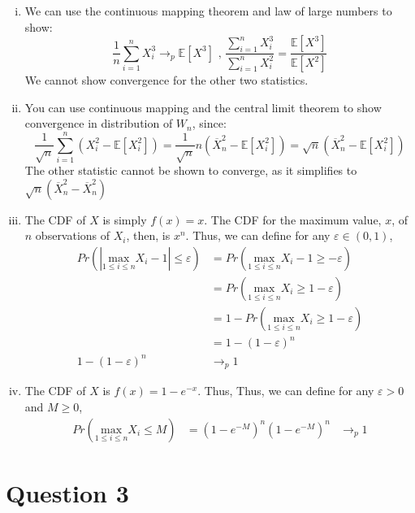 \documentclass{article}
\newcommand{\olx}[1]{\overline{X}_{#1}}
\newcommand{\est}[1]{\frac{1}{#1}\sum_{i=1}^{#1}}
\renewcommand{\Pr}[1]{\text{Pr}\left(#1\right)}
\renewcommand{\Pr}[1]{Pr\left(#1\right)}
\newcommand{\E}[1]{\mathbb{E}\left[#1\right]}%
\begin{document}
\begin{enumerate}[(i)]
	\item We can use the continuous mapping theorem and law of large numbers to show:
		\[
			\est{n}X_i^3 \rightarrow_p \E{X^3}\text{   ,   }\frac{\sum_{i=1}^n X_i^3}{\sum_{i=1}^n X_i^2}  = \frac{\E{X^3}}{\E{X^2}}
		\]
		We cannot show convergence for the other two statistics.
	
	\item You can use continuous mapping and the central limit theorem to show convergence in distribution of $W_n$, since:
		\[
			\frac{1}{\sqrt{n}}\sum_{i=1}^n\left(X_i^2-\E{X_i^2}\right) = \frac{1}{\sqrt{n}}n\left(\olx{n}^2-\E{X_i^2}\right) = \sqrt{n}\left(\olx{n}^2-\E{X_i^2}\right) 
		\]
		The other statistic cannot be shown to converge, as it simplifies to $\sqrt{n}\left(\olx{n}^2-\olx{n}^2\right)$
	
	\item The CDF of $X$ is simply $f(x)=x$. The CDF for the maximum value, $x$, of $n$ observations of $X_i$, then, is $x^n$. Thus, we can define for any $\varepsilon\in(0,1)$,
		\begin{align*}
			\Pr{|\underset{1\leq i\leq n}{\text{max}}X_i-1|\leq\varepsilon} &= \Pr{\underset{1\leq i\leq n}{\text{max}}X_i-1\geq-\varepsilon}			\\
																			&= \Pr{\underset{1\leq i\leq n}{\text{max}}X_i\geq 1-\varepsilon}		\\
																			&= 1 - \Pr{\underset{1\leq i\leq n}{\text{max}}X_i\geq 1-\varepsilon}	\\
																			&= 1 - (1-\varepsilon)^n	\\
													1 - (1-\varepsilon)^n	&\rightarrow_p 1
		\end{align*}
	
	\item The CDF of $X$ is $f(x)=1-e^{-x}$. Thus, Thus, we can define for any $\varepsilon>0$ and $M\geq 0$,
		\begin{align*}
			\Pr{\underset{1\leq i\leq n}{\text{max}}X_i\leq M} 	&= (1-e^{-M})^n
												(1-e^{-M})^n 	&\rightarrow_p 1
		\end{align*}
\end{enumerate}


\section*{Question 3}
\end{document}
